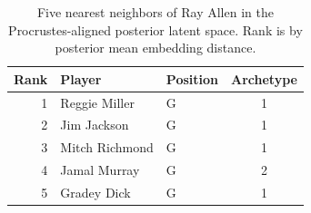 \begin{table}[htbp]
  \centering\small
  \begin{tabular}{rllc}
    \toprule
    Rank & Player & Position & Archetype \\
    \midrule
    1 & Reggie Miller & G & 1 \\
    2 & Jim Jackson & G & 1 \\
    3 & Mitch Richmond & G & 1 \\
    4 & Jamal Murray & G & 2 \\
    5 & Gradey Dick & G & 1 \\
    \bottomrule
  \end{tabular}
  \caption{Five nearest neighbors of Ray Allen in the Procrustes-aligned posterior latent space. Rank is by posterior mean embedding distance.}
  \label{tab:Ray_Allen_neighbors}
\end{table}

